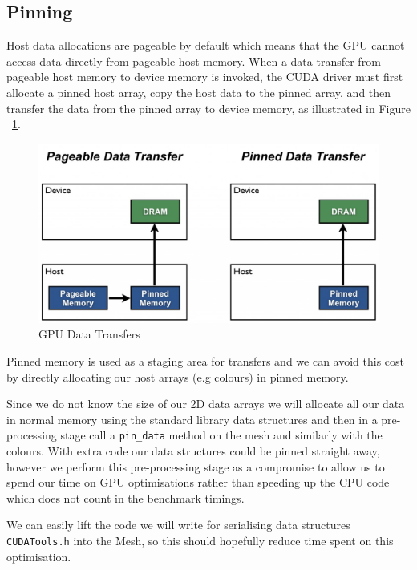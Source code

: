 \subsection{Pinning}
Host data allocations are pageable by default which means that the GPU cannot access data directly from pageable host memory. When a data transfer from pageable host memory to device memory is invoked, the CUDA driver must first allocate a pinned host array, copy the host data to the pinned array, and then transfer the data from the pinned array to device memory\cite{transfer}, as illustrated in Figure ~\ref{fig:pinning}.
\begin{figure}[H]
  \centering
  \includegraphics[scale=0.3]{images/pinning}
  \caption[pinning]{GPU Data Transfers\cite{transfer}}
  \label{fig:pinning}
\end{figure}
Pinned memory is used as a staging area for transfers and we can avoid this cost by directly allocating our host arrays (e.g colours) in pinned memory.

Since we do not know the size of our 2D data arrays we will allocate all our data in normal memory using the standard library data structures and then in a pre-processing stage call a \verb!pin_data! method on the mesh and similarly with the colours.
With extra code our data structures could be pinned straight away, however we perform this pre-processing stage as a compromise to allow us to spend our time on GPU optimisations rather than speeding up the CPU code which does not count in the benchmark timings.

We can easily lift the code we will write for serialising data structures \verb!CUDATools.h! into the Mesh, so this should hopefully reduce time spent on this optimisation.